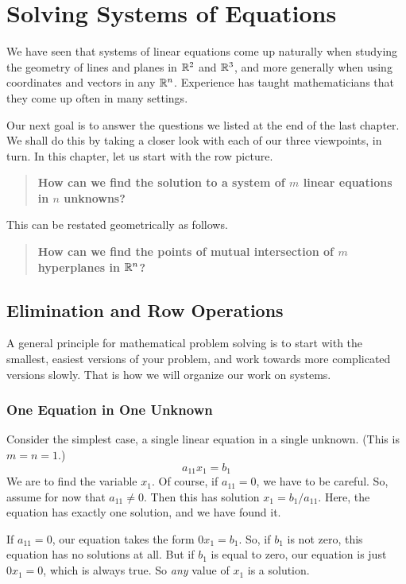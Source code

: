 \documentclass[00-livre-main.tex]{subfiles}
\begin{document}
\chapter{Solving Systems of Equations}

We have seen that systems of linear equations come up naturally when studying the geometry of lines and planes in $\mathbb{R}^2$ and $\mathbb{R}^3$, and more generally when using coordinates and vectors in any $\mathbb{R}^n$. Experience has taught mathematicians that they come up often in many settings.

Our next goal is to answer the questions we listed at the end of the last chapter. We shall do this by taking a closer look with each of our three viewpoints, in turn. In this chapter, let us start with the row picture.

\begin{quote}
\textbf{How can we find the solution to a system of $m$ linear equations in $n$ unknowns?}
\end{quote}
This can be restated geometrically as follows.
\begin{quote}
\textbf{How can we find the points of mutual intersection of $m$ hyperplanes in $\mathbb{R}^n$?}
\end{quote}


\section*{Elimination and Row Operations}

A general principle for mathematical problem solving is to start with the smallest, easiest versions of your problem, and work towards more complicated versions slowly. 
That is how we will organize our work on systems.

\subsection*{One Equation in One Unknown}

Consider the simplest case, a single linear equation in a single unknown. (This is $m=n=1$.)
\[
a_{11} x_1 = b_1
\]
We are to find the variable $x_1$. Of course, if $a_{11} = 0$, we have to be careful. So, assume for now that $a_{11}\neq 0$. Then this has solution $x_1 = b_1/a_{11}$. Here, the equation has exactly one solution, and we have found it.

If $a_{11} = 0$, our equation takes the form $0x_1 = b_1$. So, if $b_1$ is not zero, this equation has no solutions at all. But if $b_1$ is equal to zero, our equation is just $0x_1=0$, which is always true. So \emph{any} value of $x_1$ is a solution. 
\end{document}
